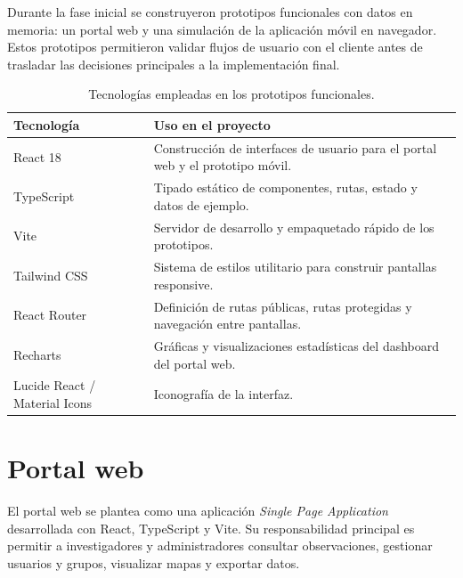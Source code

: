 Durante la fase inicial se construyeron prototipos funcionales con datos en
memoria: un portal web y una simulación de la aplicación móvil en navegador. Estos
prototipos permitieron validar flujos de usuario con el cliente antes de trasladar
las decisiones principales a la implementación final.

\begin{table}[H]
  \centering
  \caption{Tecnologías empleadas en los prototipos funcionales.}
  \label{tab:stack_mockups}
  \begin{tabularx}{\textwidth}{lX}
    \toprule
    \textbf{Tecnología} & \textbf{Uso en el proyecto} \\
    \midrule
    React 18 & Construcción de interfaces de usuario para el portal web y el prototipo móvil. \\
    TypeScript & Tipado estático de componentes, rutas, estado y datos de ejemplo. \\
    Vite & Servidor de desarrollo y empaquetado rápido de los prototipos. \\
    Tailwind CSS & Sistema de estilos utilitario para construir pantallas responsive. \\
    React Router & Definición de rutas públicas, rutas protegidas y navegación entre pantallas. \\
    Recharts & Gráficas y visualizaciones estadísticas del dashboard del portal web. \\
    Lucide React / Material Icons & Iconografía de la interfaz. \\
    \bottomrule
  \end{tabularx}
\end{table}

\section{Portal web}

El portal web se plantea como una aplicación \textit{Single Page Application}
desarrollada con React, TypeScript y Vite. Su responsabilidad principal es permitir
a investigadores y administradores consultar observaciones, gestionar usuarios y
grupos, visualizar mapas y exportar datos.


